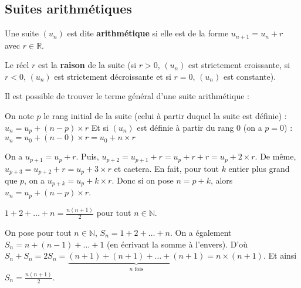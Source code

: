 	\subsection{Suites arithmétiques}
	
	\begin{formula}[Définition]
		Une suite $(u_n)$ est dite \textbf{arithmétique} si elle est de la forme $u_{n+1} = u_n + r$ avec $r \in \mathbb{R}$.
	\end{formula}
	
	\begin{formula}[Raison]
		Le réel $r$ est la \textbf{raison} de la suite (si $r > 0$, $(u_n)$ est strictement croissante, si $r < 0$, $(u_n)$ est strictement décroissante et si $r = 0$, $(u_n)$ est constante).
	\end{formula}
	
	Il est possible de trouver le terme général d'une suite arithmétique :
	
	\begin{formula}
		On note $p$ le rang initial de la suite (celui à partir duquel la suite est définie) :
		\newpar
		$u_n = u_p + (n-p) \times r$
		\newpar
		Et si $(u_n)$ est définie à partir du rang $0$ (on a $p = 0$) :
		\newpar
		$u_n = u_0 + (n-0) \times r = u_0 + n \times r$
	\end{formula}
	
	\begin{demonstration}
		On a $u_{p+1} = u_p + r$. Puis, $u_{p+2} = u_{p+1} + r = u_p + r + r = u_p + 2 \times r$. De même, $u_{p+3} = u_{p+2} + r = u_p + 3 \times r$  et caetera.
		\newline
		En fait, pour tout $k$ entier plus grand que $p$, on a $u_{p+k} = u_p + k \times r$.
		\newline
		Donc si on pose $n = p+k$, alors $u_n = u_p + (n-p) \times r$.
	\end{demonstration}
	
	\begin{formula}
		$\displaystyle{1 + 2 + \dots + n = \frac{n(n + 1)}{2}}$ pour tout $n \in \mathbb{N}$.
	\end{formula}
	
	\begin{demonstration}
		On pose pour tout $n \in \mathbb{N}$, $S_n = 1 + 2 + \dots + n$. On a également $S_n = n + (n-1) + \dots + 1$ (en écrivant la somme à l'envers).
		\newline
		D'où $S_n + S_n = 2S_n = \underbrace{(n + 1) + (n + 1) + \dots + (n + 1)}_{n \text{ fois}} = n \times (n + 1)$. Et ainsi $\displaystyle{S_n = \frac{n(n + 1)}{2}}$.
	\end{demonstration}
	

